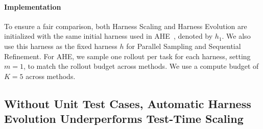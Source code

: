 \documentclass{article}
\begin{document}

\paragraph{Implementation}
To ensure a fair comparison, both Harness Scaling and Harness Evolution are initialized with the same initial harness used in AHE~\citep{lin2026agentic}, denoted by $h_1$. We also use this harness as the fixed harness $h$ for Parallel Sampling and Sequential Refinement. For AHE, we sample one rollout per task for each harness, setting $m = 1$, to match the rollout budget across methods. We use a compute budget of $K = 5$ across methods.

\subsection{Without Unit Test Cases, Automatic Harness Evolution Underperforms Test-Time Scaling}
\label{sec:experiment_without_test_feedback}

\begin{table}[h]
\centering
{}
\caption{Experimental results on Terminal-Bench 2.1 when unit test cases are unavailable. All results report pass@1. Best results in \textbf{bold} and second best in \underline{underline}. Under this setting, automatic harness evolution algorithms underperform simple test-time scaling methods.}
\label{tab:exp1}
\end{table}
\end{document}

